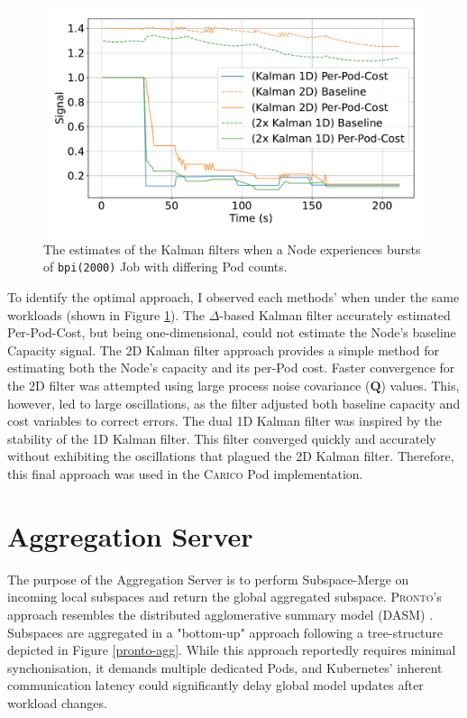 \begin{figure}[H]
    \centering
    \includegraphics[width=\textwidth]{images/filter-comparison.pdf}
    \caption{The estimates of the Kalman filters when a Node experiences bursts
    of \texttt{bpi(2000)} Job with differing Pod counts.}
    \label{fig:filter-evaluation}
\end{figure}

To identify the optimal approach, I observed each methods' when under the same
workloads (shown in Figure \ref{fig:filter-evaluation}). The $\Delta$-based
Kalman filter accurately estimated Per-Pod-Cost, but being one-dimensional,
could not estimate the Node's baseline Capacity signal. The 2D Kalman filter
approach provides a simple method for estimating both the Node's capacity and
its per-Pod cost. Faster convergence for the 2D filter was attempted using large
process noise covariance ($\mathbf{Q}$) values. This, however, led to large
oscillations, as the filter adjusted both baseline capacity and cost variables
to correct errors. The dual 1D Kalman filter was inspired by the stability of
the 1D Kalman filter. This filter converged quickly and accurately without
exhibiting the oscillations that plagued the 2D Kalman filter. Therefore, this
final approach was used in the \textsc{Carico} Pod implementation.

\section{Aggregation Server}
The purpose of the Aggregation Server is to perform Subspace-Merge on incoming
local subspaces and return the global aggregated subspace. \textsc{Pronto}'s
approach resembles the distributed agglomerative summary model (DASM) \cite{}.
Subspaces are aggregated in a "bottom-up" approach following a tree-structure
depicted in Figure \ref{pronto-agg}. While this approach reportedly requires
minimal synchonisation, it demands multiple dedicated Pods, and Kubernetes'
inherent communication latency could significantly delay global model updates
after workload changes.

